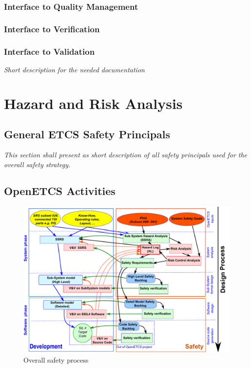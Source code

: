 \documentclass{template/openetcs_report}
\begin{document}
\subsection{Interface to Quality Management}

\subsection{Interface to Verification}

\subsection{Interface to Validation}


\textit{Short description for the needed documentation}



\chapter{Hazard and Risk Analysis}



\section{General ETCS Safety Principals}

\textit{This section shall present as short description of all safety principals used for the overall safety strategy.}



\section{OpenETCS Activities}


\begin{figure}[h]
\centering
\includegraphics[width=0.7\linewidth]{./images/WholeSafetyProcess}
\caption[Overall safety process]{Overall safety process}
\label{fig:SafetyProcess}
\end{figure}
\end{document}
